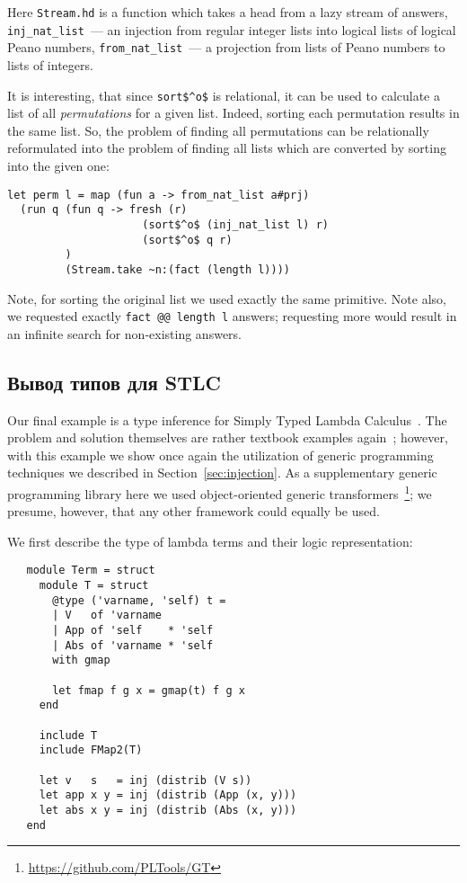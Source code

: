 Here \lstinline|Stream.hd| is a function which takes a head from a lazy stream of answers,
\lstinline|inj_nat_list|~--- an injection from regular integer lists into logical lists of logical Peano numbers,
\lstinline|from_nat_list|~--- a projection from lists of Peano numbers to lists of integers.

It is interesting, that since \lstinline|sort$^o$| is
relational, it can be used to calculate a list of all \emph{permutations}
for a given list. Indeed, sorting each permutation results in the same list.
So, the problem of finding all permutations can be relationally reformulated into
the problem of finding all lists which are converted by sorting into the given one:

\begin{lstlisting}
let perm l = map (fun a -> from_nat_list a#prj)
  (run q (fun q -> fresh (r)
                     (sort$^o$ (inj_nat_list l) r)
                     (sort$^o$ q r)
         )
         (Stream.take ~n:(fact (length l))))
\end{lstlisting}

Note, for sorting the original list we used exactly the same primitive. Note also,
we requested exactly \lstinline|fact @@ length l| answers; requesting more
would result in an infinite search for non-existing answers.

\subsection{Вывод типов для STLC}

Our final example is a type inference for Simply Typed Lambda Calculus~\cite{Lambda}. The problem and
solution themselves are rather textbook examples again~\cite{TRS, WillThesis}; however, with this example
we show once again the utilization of generic programming techniques we described in Section~\ref{sec:injection}.
As a supplementary generic programming library here we used object-oriented generic transformers~\cite{?}\footnote{\url{https://github.com/PLTools/GT}};
we presume, however, that any other framework could equally be used.

We first describe the type of lambda terms and their logic representation:

\begin{lstlisting}
   module Term = struct
     module T = struct
       @type ('varname, 'self) t =
       | V   of 'varname
       | App of 'self    * 'self
       | Abs of 'varname * 'self
       with gmap

       let fmap f g x = gmap(t) f g x
     end

     include T
     include FMap2(T)

     let v   s   = inj (distrib (V s))
     let app x y = inj (distrib (App (x, y)))
     let abs x y = inj (distrib (Abs (x, y)))
   end
\end{lstlisting}

